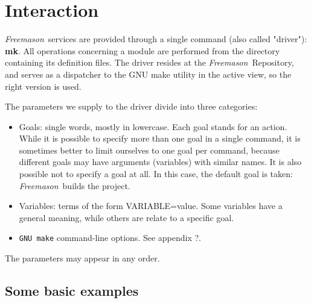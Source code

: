 \documentclass[a4paper]{article}
\newcommand{\freemason}{\textit{Freemason}}
\begin{document}

\newpage
\watermarkgraphic{}%
\watermark%
%
%

\chapter{Interaction}

\freemason\ services are provided through a single command (also called "driver"): \textbf{mk}.
All operations concerning a module are performed from the directory containing its definition files.
The driver resides at the \freemason\ Repository, and serves as a dispatcher to the GNU make utility in the
active view, so the right version is used.
\par
The parameters we supply to the driver divide into three categories:
\begin{itemize}
    \item Goals: single words, mostly in lowercase. Each goal stands for an action. While it is possible to specify
        more than one goal in a single command, it is sometimes better to limit ourselves to one goal per command, because
        different goals may have arguments (variables) with similar names. It is also possible not to specify a goal at all.
        In this case, the default goal is taken: \freemason\ builds the project.
    \item Variables: terms of the form VARIABLE=value. Some variables have a general meaning, while others are relate to a specific goal.
    \item \verb"GNU make" command-line options. See appendix ?.
\end{itemize}
The parameters may appear in any order.

\section{Some basic examples}
\end{document}

